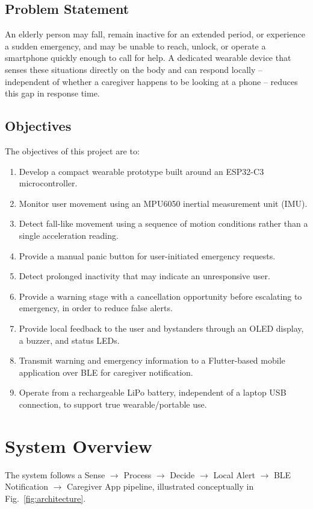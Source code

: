 \documentclass[lettersize,journal]{IEEEtran}
\begin{document}
\subsection{Problem Statement}
An elderly person may fall, remain inactive for an extended period, or experience a sudden emergency, and may be unable to reach, unlock, or operate a smartphone quickly enough to call for help. A dedicated wearable device that senses these situations directly on the body and can respond locally -- independent of whether a caregiver happens to be looking at a phone -- reduces this gap in response time.

\subsection{Objectives}
The objectives of this project are to:
\begin{enumerate}
\item Develop a compact wearable prototype built around an ESP32-C3 microcontroller.
\item Monitor user movement using an MPU6050 inertial measurement unit (IMU).
\item Detect fall-like movement using a sequence of motion conditions rather than a single acceleration reading.
\item Provide a manual panic button for user-initiated emergency requests.
\item Detect prolonged inactivity that may indicate an unresponsive user.
\item Provide a warning stage with a cancellation opportunity before escalating to emergency, in order to reduce false alerts.
\item Provide local feedback to the user and bystanders through an OLED display, a buzzer, and status LEDs.
\item Transmit warning and emergency information to a Flutter-based mobile application over BLE for caregiver notification.
\item Operate from a rechargeable LiPo battery, independent of a laptop USB connection, to support true wearable/portable use.
\end{enumerate}

\section{System Overview}
The system follows a Sense $\rightarrow$ Process $\rightarrow$ Decide $\rightarrow$ Local Alert $\rightarrow$ BLE Notification $\rightarrow$ Caregiver App pipeline, illustrated conceptually in Fig.~\ref{fig:architecture}.
\end{document}
